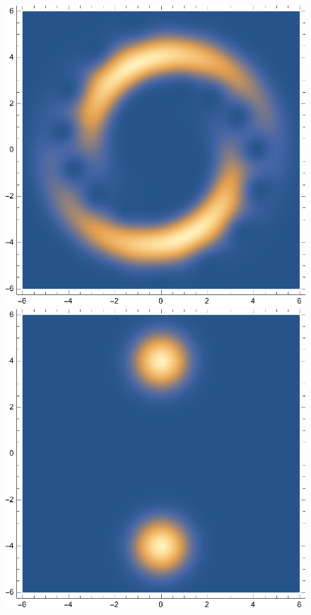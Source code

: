 \documentclass{article}
\theoremstyle{definition}
\begin{document}
\begin{enumerate}[label=\alph*)]
\begin{figure}[!htb]
\begin{minipage}{.24\textwidth}
	\end{minipage}
	\begin{minipage}{.24\textwidth}
  	\centering
  	\includegraphics[width=.7\linewidth]{figures/5-60.eps}
	\end{minipage} \begin{minipage}{.24\textwidth}
  	\centering
  	\includegraphics[width=.7\linewidth]{figures/5-64.eps}
	\end{minipage}%
	\begin{minipage}{.24\textwidth}
  	\centering

\end{minipage}
\end{figure}
\end{enumerate}
\end{document}

